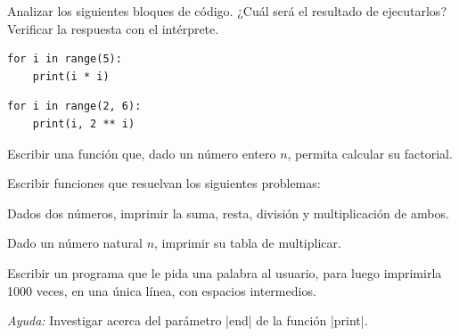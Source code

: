 \begin{ejercicio}
Analizar los siguientes bloques de código. ¿Cuál será el resultado de
ejecutarlos? Verificar la respuesta con el intérprete.
\begin{partes}
\item \begin{verbatim}
for i in range(5):
    print(i * i)
\end{verbatim}
\item \begin{verbatim}
for i in range(2, 6):
    print(i, 2 ** i)
\end{verbatim}
\end{partes}
\end{ejercicio}

\begin{ejercicio} Escribir una función que, dado un número entero $n$,
    permita calcular su factorial\label{ej:factorial}.
\end{ejercicio}

\begin{ejercicio} Escribir funciones que resuelvan los siguientes problemas:
\begin{partes}
  \item Dados dos números, imprimir la suma, resta, división y multiplicación
  de ambos.
  \item Dado un número natural $n$, imprimir su tabla de multiplicar.
\end{partes}
\end{ejercicio}

\begin{ejercicio}
Escribir un programa que le pida una palabra al usuario, para luego
imprimirla 1000 veces, en una única línea, con espacios intermedios.

\emph{Ayuda:} Investigar acerca del parámetro |end| de la función |print|.
\end{ejercicio}
